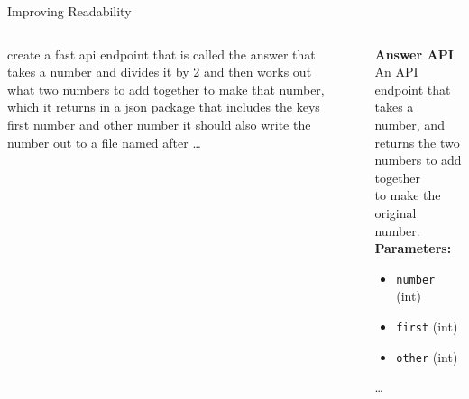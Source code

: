\documentclass[bigger]{beamer}
\begin{document}
\begin{frame}{Improving Readability}
  \begin{columns}
    \begin{column}{0.45\textwidth}
      \begin{block}{}
        create a fast api endpoint that is called the answer
        that takes a number and divides it by 2 and then works
        out what two numbers to add together to make that number,
        which it returns in a json package that includes the keys
        first number and other number it should also write the
        number out to a file named after \ldots
      \end{block}
    \end{column}
    \begin{column}{0.1\textwidth}
      \centering \bf
      $\Rightarrow$
    \end{column}
    \begin{column}{0.45\textwidth}
      \begin{block}{}
        \textbf{\Large Answer API}\\
        An API endpoint that takes a number,
        and returns the two numbers to add together\\
        to make the original number.
        \vfill
        \textbf{Parameters:}
        \begin{itemize}
          \item \texttt{number} (int)
          \item \texttt{first} (int)
          \item \texttt{other} (int)
        \end{itemize}
        \ldots
      \end{block}
    \end{column}
  \end{columns}
\end{frame}
\end{document}
